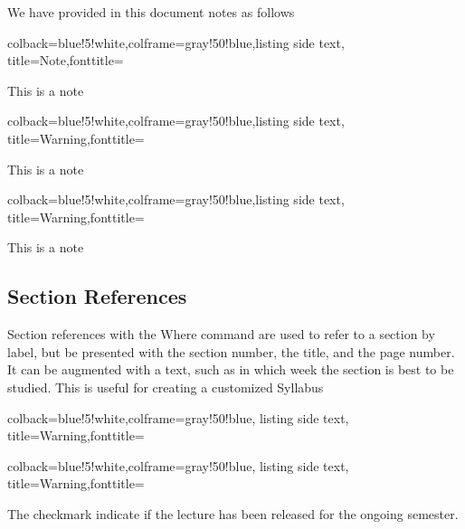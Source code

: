 We have provided in this document notes as follows


\begin{tcblisting}{colback=blue!5!white,colframe=gray!50!blue,listing side text,  title=Note,fonttitle=\bfseries}
\begin{NOTE}
This is a note
\end{NOTE}
\end{tcblisting}

\begin{tcblisting}{colback=blue!5!white,colframe=gray!50!blue,listing side text,  title=Warning,fonttitle=\bfseries}
\begin{WARNING}
This is a note
\end{WARNING}
\end{tcblisting}

\begin{tcblisting}{colback=blue!5!white,colframe=gray!50!blue,listing side text,  title=Warning,fonttitle=\bfseries}
\begin{IU}
This is a note
\end{IU}
\end{tcblisting}

\subsection{Section References}

Section references with the Where command are used to refer to a
section by label, but be presented with the section number, the title,
and the page number. It can be augmented with a text, such as in which
week the section is best to be studied. This is useful for creating a
customized Syllabus

\begin{tcblisting}{colback=blue!5!white,colframe=gray!50!blue,
    listing side text, title=Warning,fonttitle=\bfseries}
\end{tcblisting}

\begin{tcblisting}{colback=blue!5!white,colframe=gray!50!blue,
    listing side text, title=Warning,fonttitle=\bfseries}
\end{tcblisting}

The checkmark indicate if the lecture has been released for the
ongoing semester.
